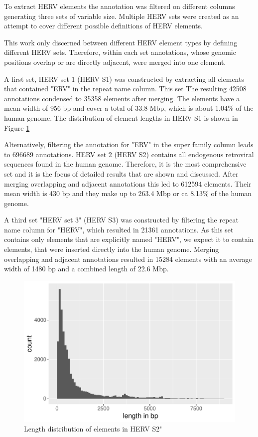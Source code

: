 \documentclass[a4paper,12pt]{article}
\begin{document}
To extract HERV elements the annotation was filtered on different columns generating three sets of variable size. Multiple HERV sets were created as an attempt to cover different possible definitions of HERV elements.

This work only discerned between different HERV element types by defining different HERV sets. Therefore, within each set annotations, whose genomic positions overlap or are directly adjacent, were merged into one element.

A first set, HERV set 1 (HERV S1) was constructed by extracting all elements that contained "ERV" in the repeat name column. This set
The resulting 42508 annotations condensed to 35358 elements after merging. The elements have a mean width of 956 bp and cover a total of 33.8 Mbp, which is about 1.04\% of the human genome. The distribution of element lengths in HERV S1 is shown in Figure \ref{fig:hervS1.lengths.hist}  

Alternatively, filtering the annotation for "ERV" in the super family column leads to 696689 annotations. HERV set 2 (HERV S2) contains all endogenous retroviral sequences found in the human genome. Therefore, it is the most comprehensive set and it is the focus of detailed results that are shown and discussed. After merging overlapping and adjacent annotations this led to 612594 elements. Their mean width is 430 bp and they make up to 263.4 Mbp or ca 8.13\% of the human genome. 

A third set "HERV set 3" (HERV S3) was constructed by filtering the repeat name column for "HERV", which resulted in 21361 annotations. As this set contains only elements that are explicitly named "HERV", we expect it to contain elements, that were inserted directly into the human genome. Merging overlapping and adjacent annotations resulted in 15284 elements with an average width of 1480 bp and a combined length of 22.6 Mbp.

\begin{figure}[tb]
	\includegraphics[scale = 1, keepaspectratio = true]{../figures/hervS1_lengths_hist}  
	\caption{Length distribution of elements in HERV S2"}
    \label{fig:hervS1.lengths.hist}
\end{figure}
\end{document}
